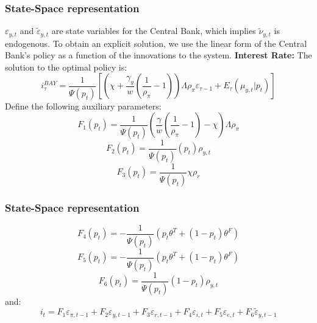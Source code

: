 \documentclass{beamer}
\begin{document}
\begin{frame} 
\frametitle{State-Space representation}
$\varepsilon_{y,t}$ and $\tilde{\varepsilon}_{y,t}$ are state variables for the
Central Bank, which implies $\tilde{\nu}_{y,t}$ is endogenous. To obtain an
explicit solution, we use the linear form of the Central Bank's policy as a
function of the innovations to the system.
\newline
\newline
\textbf{Interest Rate:} The solution to the optimal policy is:
\begin{equation}
i_\tau^{BAY} = \frac{1}{\Psi (p_t)} \left [ \left ( \chi + \frac{\gamma_y}{w} ( \frac{1}{\rho_\pi} - 1) \right ) \Lambda \rho_\pi \varepsilon_{\tau-1} + E_\tau (\mu_{y,t}|p_t) \right ]
\end{equation}
Define the following auxiliary parameters:
\begin{equation}
F_1 (p_t) = \frac{1}{\Psi (p_t)} \left ( \frac{\gamma}{w} ( \frac{1}{\rho_\pi} - 1 ) - \chi \right ) \Lambda \rho_\pi
\end{equation}
\begin{equation}
F_2 (p_t) = \frac{1}{\Psi (p_t)} (p_t) \rho_{y,t}
\end{equation}
\begin{equation}
F_3 (p_t) = \frac{1}{\Psi (p_t)} \chi \rho_r
\end{equation}
\end{frame}

\begin{frame}
\frametitle{State-Space representation}
\begin{equation}
F_4 (p_t) = -\frac{1}{\Psi (p_t)} \left (p_t \theta^T + (1-p_t) \theta^F \right )
\end{equation}
\begin{equation}
F_5 (p_t) = -\frac{1}{\Psi (p_t)} \left (p_t \theta^T + (1-p_t) \theta^F \right )
\end{equation}
\begin{equation}
F_6 (p_t) = \frac{1}{\Psi (p_t)} ( 1 - p_t) \rho_{y,t}
\end{equation}
and:
\begin{equation}
i_t = F_1 \varepsilon_{\pi,t-1} + F_2 \varepsilon_{y,t-1} + F_3 \varepsilon_{r,t-1} + F_4 \varepsilon_{i,t} + F_5 \varepsilon_{e,t} + F_6 \tilde{\varepsilon}_{y,t-1}
\end{equation}
\end{frame}
\end{document}
